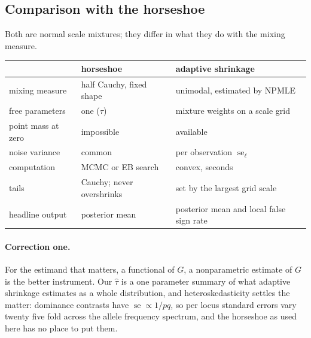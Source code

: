 \subsection{Comparison with the horseshoe}

Both are normal scale mixtures; they differ in what they do with the mixing measure.

\begin{center}
\begin{tabularx}{\textwidth}{l>{\raggedright\arraybackslash}X>{\raggedright\arraybackslash}X}
\toprule
& horseshoe & adaptive shrinkage \\
\midrule
mixing measure & half Cauchy, fixed shape & unimodal, estimated by NPMLE \\
free parameters & one ($\tau$) & mixture weights on a scale grid \\
point mass at zero & impossible & available \\
noise variance & common & per observation $\operatorname{se}_\ell$ \\
computation & MCMC or EB search & convex, seconds \\
tails & Cauchy; never overshrinks & set by the largest grid scale \\
headline output & posterior mean & posterior mean and local false sign rate \\
\bottomrule
\end{tabularx}
\end{center}

\paragraph{Correction one.} For the estimand that matters, a functional of $G$, a nonparametric
estimate of $G$ is the better instrument. Our $\hat\tau$ is a one parameter summary of what adaptive
shrinkage estimates as a whole distribution, and heteroskedasticity settles the matter: dominance
contrasts have $\operatorname{se}\propto1/pq$, so per locus standard errors vary twenty five fold
across the allele frequency spectrum, and the horseshoe as used here has no place to put them.

